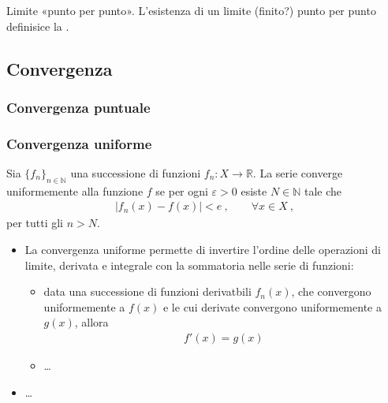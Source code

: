 \documentclass[letterpaper,10pt,italian]{jupyterBook}
\begin{document}
\sphinxAtStartPar
{} Limite «punto per punto». L’esistenza di un limite (finito?) punto per punto definisice la {\hyperref[\detokenize{ch/series:math-hs-series-fun-sequences-convergence-point}]{}}.


\subsection{Convergenza}
\label{\detokenize{ch/series:convergenza}}\label{\detokenize{ch/series:math-hs-series-fun-sequences-convergence}}

\subsubsection{Convergenza puntuale}
\label{\detokenize{ch/series:convergenza-puntuale}}\label{\detokenize{ch/series:math-hs-series-fun-sequences-convergence-point}}
\sphinxAtStartPar
{} 


\subsubsection{Convergenza uniforme}
\label{\detokenize{ch/series:convergenza-uniforme}}\label{\detokenize{ch/series:math-hs-series-fun-sequences-convergence-uniform}}
\sphinxAtStartPar
Sia \(\{ f_n \}_{n \in \mathbb{N}}\) una successione di funzioni \(f_n:  X \rightarrow \mathbb{R}\). La serie converge uniformemente alla funzione \(f\) se per ogni \(\varepsilon > 0\) esiste \(N \in \mathbb{N}\) tale che
\begin{equation*}
\begin{split}|f_n(x) - f(x)| < e \ , \qquad \forall x \in X \ ,\end{split}
\end{equation*}
\sphinxAtStartPar
per tutti gli \(n > N\).

\sphinxAtStartPar
{}
\begin{itemize}
\item {} 
\sphinxAtStartPar
La convergenza uniforme permette di invertire l’ordine delle operazioni di limite, derivata e integrale con la sommatoria nelle serie di funzioni:
\begin{itemize}
\item {} 
\sphinxAtStartPar
data una successione di funzioni derivatbili \(f_n(x)\), che convergono uniformemente a \(f(x)\) e le cui derivate convergono uniformemente a \(g(x)\), allora
\begin{equation*}
\begin{split}f'(x) = g(x)\end{split}
\end{equation*}
\item {} 
\sphinxAtStartPar
…

\end{itemize}

\item {} 
\sphinxAtStartPar
…

\end{itemize}
\end{document}

